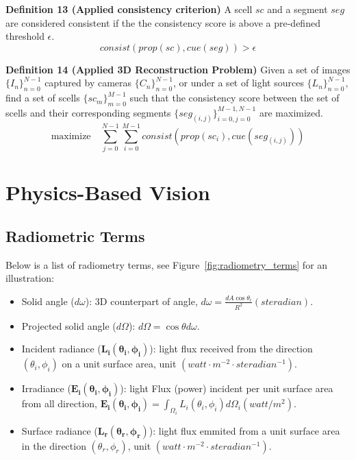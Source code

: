 \noindent\textbf{Definition 13 (Applied consistency criterion)} A scell $sc$ and a segment $seg$ are considered consistent if the the consistency score is above a pre-defined threshold $\epsilon$.
$$
consist(prop(sc), cue(seg)) > \epsilon
$$


\noindent\textbf{Definition 14 (Applied 3D Reconstruction Problem)} Given a set of images $\{I_n\}_{n=0}^{N-1}$ captured by cameras $\{C_n\}_{n=0}^{N-1}$, or under a set of light sources $\{L_n\}_{n=0}^{N-1}$, find a set of scells $\{sc_m\}_{m=0}^{M-1}$ such that the consistency score between the set of scells and their corresponding segments $\{seg_{(i, j)}\}_{i=0,j=0}^{M-1,N-1}$ are maximized.
$$
\mbox{maximize} \quad \sum_{j=0}^{N-1}\sum_{i=0}^{M-1} consist(prop(sc_i), cue(seg_{(i, j)}))
$$

\section{Physics-Based Vision}
\label{sec:pbv}

\subsection{Radiometric Terms}
\label{sec:radio_term}
Below is a list of radiometry terms, see Figure~\ref{fig:radiometry_terms} for an illustration:
\begin{itemize}
\item Solid angle ($d\omega$): 3D counterpart of angle, $d\omega=\frac{dA \cos\theta_i}{R^2}\mathit{ (steradian)}$.
\item Projected solid angle ($d\Omega$): $d\Omega = \cos\theta d\omega$.
\item Incident radiance ($\mathbf{L_i(\theta_i, \phi_i)}$): light flux received from the direction $(\theta_i, \phi_i)$ on a unit surface area, unit $\mathit{ (watt\cdot m^{-2}\cdot steradian^{-1})}$.
\item Irradiance ($\mathbf{E_i(\theta_i, \phi_i)}$): light Flux (power) incident per unit surface area from all direction, $\mathbf{E_i(\theta_i, \phi_i)}=\int_{\Omega_i} L_i(\theta_i, \phi_i) d\Omega_i \mathit{ (watt/m^2)}$.
\item Surface radiance ($\mathbf{L_r(\theta_r, \phi_r)}$): light flux emmited from a unit surface area in the direction $(\theta_r, \phi_r)$, unit $\mathit{ (watt\cdot m^{-2}\cdot steradian^{-1})}$.
\end{itemize}

